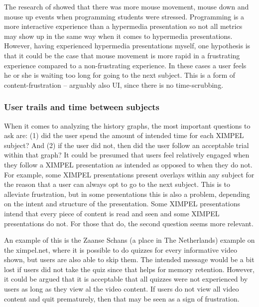 The research of \cite{rodrigues2013} showed that there was more mouse movement, mouse down and mouse up events when programming students were stressed. Programming is a more interactive experience than a hypermedia presentation so not all metrics may show up in the same way when it comes to hypermedia presentations. However, having experienced hypermedia presentations myself, one hypothesis is that it could be the case that mouse movement is more rapid in a frustrating experience compared to a non-frustrating experience. In these cases a user feels he or she is waiting too long for going to the next subject. This is a form of content-frustration -- arguably also UI, since there is no time-scrubbing. 


\subsubsection{User trails and time between subjects}

When it comes to analyzing the history graphs, the most important questions to ask are: (1) did the user spend the amount of intended time for each XIMPEL subject? And (2) if the user did not, then did the user follow an acceptable trial within that graph? It could be presumed that users feel relatively engaged when they follow a XIMPEL presentation as intended as opposed to when they do not. For example, some XIMPEL presentations present overlays within any subject for the reason that a user can always opt to go to the next subject. This is to alleviate frustration, but in some presentations this is also a problem, depending on the intent and structure of the presentation. Some XIMPEL presentations intend that every piece of content is read and seen and some XIMPEL presentations do not. For those that do, the second question seems more relevant. 

An example of this is the Zaanse Schans (a place in The Netherlands) example on the ximpel.net, where it is possible to do quizzes for every informative video shown, but users are also able to skip them. The intended message would be a bit lost if users did not take the quiz since that helps for memory retention. However, it could be argued that it is acceptable that all quizzes were not experienced by users as long as they view al the video content. If users do not view all video content and quit prematurely, then that may be seen as a sign of frustration.

